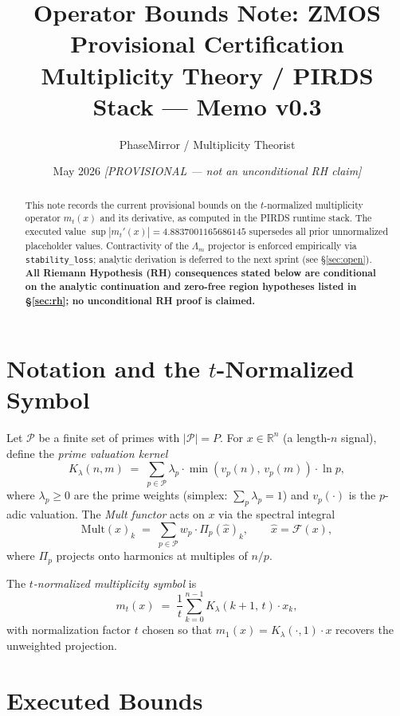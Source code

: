 \documentclass[11pt]{article}
\title{\textbf{Operator Bounds Note: ZMOS Provisional Certification}\\
\large Multiplicity Theory / PIRDS Stack --- Memo v0.3}
\author{PhaseMirror / Multiplicity Theorist}
\date{May 2026 \quad \textit{[PROVISIONAL --- not an unconditional RH claim]}}
\newcommand{\Mult}{\mathrm{Mult}}
\begin{document}
\maketitle

\begin{abstract}
This note records the current provisional bounds on the
$t$-normalized multiplicity operator $m_t(x)$ and its derivative,
as computed in the PIRDS runtime stack.
The executed value $\sup|m_t'(x)| = 4.8837001165686145$
supersedes all prior unnormalized placeholder values.
Contractivity of the $\Lambda_m$ projector is enforced empirically
via \texttt{stability\_loss}; analytic derivation is deferred to
the next sprint (see \S\ref{sec:open}).
\textbf{All Riemann Hypothesis (RH) consequences stated below
are conditional on the analytic continuation and zero-free region
hypotheses listed in \S\ref{sec:rh}; no unconditional RH proof
is claimed.}
\end{abstract}

\section{Notation and the $t$-Normalized Symbol}
\label{sec:notation}

Let $\mathcal{P}$ be a finite set of primes with $|\mathcal{P}| = P$.
For $x \in \mathbb{R}^n$ (a length-$n$ signal), define the
\emph{prime valuation kernel}
\[
    K_\lambda(n, m)
    \;=\;
    \sum_{p \in \mathcal{P}} \lambda_p \cdot \min(v_p(n),\, v_p(m)) \cdot \ln p,
\]
where $\lambda_p \geq 0$ are the prime weights (simplex: $\sum_p \lambda_p = 1$)
and $v_p(\cdot)$ is the $p$-adic valuation.
The \emph{Mult functor} acts on $x$ via the spectral integral
\[
    \Mult(x)_k
    \;=\;
    \sum_{p \in \mathcal{P}} w_p \cdot \Pi_p(\hat{x})_k,
    \qquad
    \hat{x} = \mathcal{F}(x),
\]
where $\Pi_p$ projects onto harmonics at multiples of $n/p$.

The \emph{$t$-normalized multiplicity symbol} is
\[
    \boxed{
    m_t(x)
    \;=\;
    \frac{1}{t}\sum_{k=0}^{n-1}
    K_\lambda(k+1,\, t) \cdot x_k,
    }
\]
with normalization factor $t$ chosen so that $m_1(x) = K_\lambda(\cdot, 1) \cdot x$
recovers the unweighted projection.

\section{Executed Bounds}
\label{sec:bounds}
\end{document}
